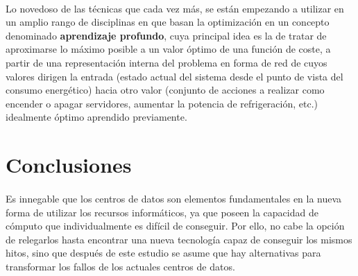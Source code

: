 \documentclass[12pt]{article}
\begin{document}
			\paragraph{}
			Lo novedoso de las técnicas que cada vez más, se están empezando a utilizar en un amplio rango de disciplinas en que basan la optimización en un concepto denominado \textbf{aprendizaje profundo}, cuya principal idea es la de tratar de aproximarse lo máximo posible a un valor óptimo de una función de coste, a partir de una representación interna del problema en forma de red de  cuyos valores dirigen la entrada (estado actual del sistema desde el punto de vista del consumo energético) hacia otro valor (conjunto de acciones a realizar como encender o apagar servidores, aumentar la potencia de refrigeración, etc.) idealmente óptimo aprendido previamente.
            

  \section{Conclusiones}
	\label{sec:conclusiones}
    \paragraph{}
    Es innegable que los centros de datos son elementos fundamentales en la nueva forma de utilizar los recursos informáticos, ya que poseen la capacidad de cómputo que individualmente es difícil de conseguir. Por ello, no cabe la opción de relegarlos hasta encontrar una nueva tecnología capaz de conseguir los mismos hitos, sino que después de este estudio se asume que hay alternativas para transformar los fallos de los actuales centros de datos.
\end{document}

